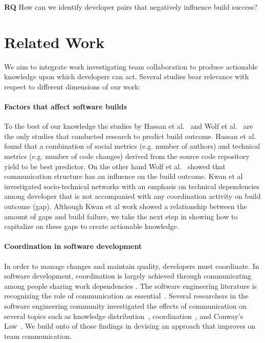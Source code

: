 \documentclass[conference]{IEEEtran}
\begin{document}
\textbf{RQ} How can we identify developer pairs that negatively influence build success?
 

\section{Related Work}
\label{sec:relwork}
We aim to integrate work investigating team collaboration to produce actionable knowledge upon which developers can act.
Several studies bear relevance with respect to different dimensions of our work:

\paragraph{Factors that affect software builds}
To the best of our knowledge the studies by Hassan et al.~\cite{hassan:ase:2006}
and Wolf et al.~\cite{wolf:icse:2009} are the only studies that conducted
research to predict build outcome. Hassan et al.~\cite{hassan:ase:2006} found
that a combination of social metrics (e.g. number of authors) and technical
metrics (e.g. number of code changes) derived from the source code repository
yield to be best predictor. 
On the other hand Wolf et al.~\cite{wolf:icse:2009} showed that communication structure has an influence on the build outcome.
Kwan et al~\cite{kwan:tse:2011} investigated socio-technical networks with an emphasis on technical dependencies among developer that is not accompanied with any coordination activity on build outcome (gap).
Although Kwan et al work showed a relationship between the amount of gaps and build failure, we take the next step in showing how to capitalize on these gaps to create actionable knowledge.

\paragraph{Coordination in software development}
In order to manage changes and maintain quality, developers must coordinate. In
software development, coordination is largely achieved through communicating among
people sharing work dependencies \cite{kraut1995:coordination}. The
software engineering literature is recognizing the role of communication as essential~\cite{nakakoji2010:rdc}.
Several researchers in the software engineering community investigated the effects of communication on several topics such as knowledge distribution~\cite{ehrlich:icgse:2006}, coordination~\cite{hinds:cscw:2006}, and Conway's Law~\cite{cataldo:cscw:2006}.
We build onto of those findings in devising an approach that improves on team communication.
\end{document}
